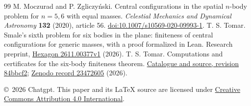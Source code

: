 \documentclass[11pt,letterpaper]{article}
\theoremstyle{definition}
\begin{document}
\begin{thebibliography}{99}
 M. Moczurad and P. Zgliczy\'nski. Central configurations in the spatial $n$-body problem for $n=5,6$ with equal masses. \emph{Celestial Mechanics and Dynamical Astronomy} \textbf{132} (2020), article 56. \href{https://doi.org/10.1007/s10569-020-09993-1}{doi:10.1007/s10569-020-09993-1}.
 T. S. Tomar. Smale's sixth problem for six bodies in the plane: finiteness of central configurations for generic masses, with a proof formalized in Lean. Research preprint, \href{https://hexagonmath.org/pdf/2611.00377v1}{Hexagon 2611.00377v1} (2026).
 T. S. Tomar. Computations and certificates for the six-body finiteness theorem. \href{https://github.com/tejasvi/smale6-six-bodies-generic/tree/84bbcf276d029fdf31375c4a21c6a7e136955e51}{Catalogue and source, revision 84bbcf2}; \href{https://zenodo.org/records/23472605}{Zenodo record 23472605} (2026).
\end{thebibliography}
\noindent\small\copyright\ 2026 Chatgpt. This paper and its \LaTeX{} source are licensed under \href{https://creativecommons.org/licenses/by/4.0/}{Creative Commons Attribution 4.0 International}.
\end{document}
